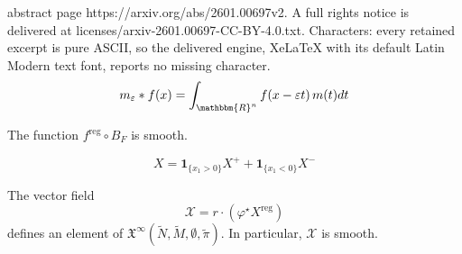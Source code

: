 \documentclass[10pt,a4paper]{amsart}
\newcommand{\cR}{\ensuremath{\mathbbm{R}}}
\newcommand{\eps}{\varepsilon }
\newcommand{\reg}{\mathrm{reg}}
\newcommand{\tmmathbf}[1]{\ensuremath{\boldsymbol{#1}}}
\newcommand{\vf}{f}
\begin{document}
abstract page https://arxiv.org/abs/2601.00697v2. A full rights notice is delivered at licenses/arxiv-2601.00697-CC-BY-4.0.txt. Characters: every retained excerpt is pure ASCII, so the delivered engine, XeLaTeX with its default Latin Modern text font, reports no missing character.
\begin{equation}\label{expr-f_k}
m_\eps \ast \vf(x)= \int_{\cR^n} f (x - \eps t)\, m (t) d t
\end{equation}

\begin{Lemma}\label{Lemma-partial-conv}
The function $f^\reg\circ B_F$ is smooth.
\end{Lemma}

\begin{equation}\label{def-X}
 X = \tmmathbf{1}_{\{ x_1 > 0 \}} X^+ + \tmmathbf{1}_{\{ x_1 < 0 \}} X^- 
\end{equation}

\begin{Proposition}\label{prop-smoothing-one-comp}
The vector field 
$$\mathcal{X} = r\cdot (\varphi^\star X^\reg)$$ 
defines an element of $\mathfrak{X }^{\infty}(\tilde N,\tilde M,\emptyset,\tilde \pi)$.  In particular, $\mathcal{X}$ is smooth.
\end{Proposition}
\end{document}
